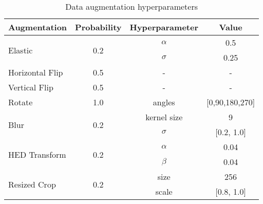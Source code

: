 \begin{table}[h]
\centering
\caption{Data augmentation hyperparameters}
\label{tab:data-augmentation}
\begin{tabular}{lc|cc}
\toprule
\textbf{Augmentation} & \textbf{Probability} & \textbf{Hyperparameter} & \textbf{Value} \\ 
\midrule
\multirow{2}{*}{Elastic} & \multirow{2}{*}{0.2} & $\alpha$ & 0.5 \\ 
 &  & $\sigma$ & 0.25 \\ 
\midrule
Horizontal Flip & 0.5 & - & - \\ 
\midrule
Vertical Flip & 0.5 & - & - \\ 
\midrule
\multirow{1}{*}{Rotate} & \multirow{1}{*}{1.0} & angles & [0,90,180,270] \\ 
\midrule
\multirow{2}{*}{Blur} & \multirow{2}{*}{0.2} & kernel size & 9 \\ 
 &  & $\sigma$ & [0.2, 1.0] \\ 
\midrule
\multirow{2}{*}{HED Transform} & \multirow{2}{*}{0.2} & $\alpha$ & 0.04 \\ 
 &  & $\beta$ & 0.04 \\ 
\midrule
\multirow{2}{*}{Resized Crop} & \multirow{2}{*}{0.2} & size & 256 \\ 
 &  & scale & [0.8, 1.0] \\ 
\bottomrule
\end{tabular}
\end{table}
